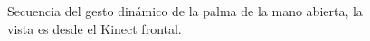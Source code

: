 \begin{figure}[h!]
\begin{center}
\end{center}
\caption{Secuencia del gesto dinámico de la palma de la mano abierta, la vista es desde el Kinect frontal.}
\label{fig:G1}
\end{figure}

